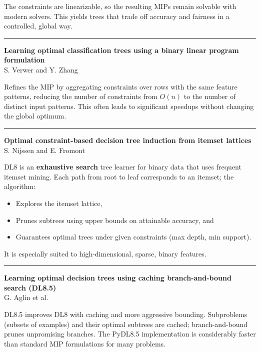 \documentclass[a5paper]{article}
\providecommand{\tightlist}{%
  \setlength{\itemsep}{0pt}\setlength{\parskip}{0pt}}
\begin{document}
The constraints are linearizable, so the resulting MIPs remain solvable
with modern solvers. This yields trees that trade off accuracy and
fairness in a controlled, global way.

\begin{center}\rule{0.5\linewidth}{0.5pt}\end{center}

\textbf{Learning optimal classification trees using a binary linear
program formulation}\\
S. Verwer and Y. Zhang

Refines the MIP by aggregating constraints over rows with the same
feature patterns, reducing the number of constraints from $O(n)$ to the
number of distinct input patterns. This often leads to significant
speedups without changing the global optimum.

\begin{center}\rule{0.5\linewidth}{0.5pt}\end{center}

\textbf{Optimal constraint-based decision tree induction from itemset
lattices}\\
S. Nijssen and E. Fromont

DL8 is an \textbf{exhaustive search} tree learner for binary data that
uses frequent itemset mining. Each path from root to leaf corresponds to
an itemset; the algorithm:

\begin{itemize}
\tightlist
\item
  Explores the itemset lattice,
\item
  Prunes subtrees using upper bounds on attainable accuracy, and
\item
  Guarantees optimal trees under given constraints (max depth, min
  support).
\end{itemize}

It is especially suited to high-dimensional, sparse, binary features.

\begin{center}\rule{0.5\linewidth}{0.5pt}\end{center}

\textbf{Learning optimal decision trees using caching branch-and-bound
search (DL8.5)}\\
G. Aglin et al.

DL8.5 improves DL8 with caching and more aggressive bounding.
Subproblems (subsets of examples) and their optimal subtrees are cached;
branch-and-bound prunes unpromising branches. The PyDL8.5 implementation
is considerably faster than standard MIP formulations for many problems.
\end{document}
